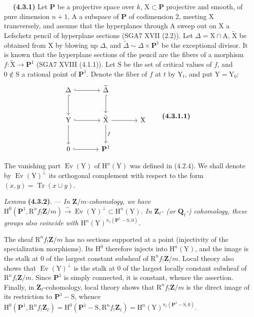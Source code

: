 \documentclass[11pt,leqno]{article}
\newcommand{\Page}[1]{\ifvmode\noindent\else\unskip\ \fi{\footnotesize\textcolor{gray}{[p.\,#1]}}\ \ignorespaces}
\begin{document}
\Page{222}
\textbf{(4.3.1)} Let \(\mathbf{P}\) be a projective space over \(k\), \(\mathrm{X}\subset\mathbf{P}\) projective and smooth, of pure dimension \(n+1\), \(\mathrm{A}\) a subspace of \(\mathbf{P}\) of codimension 2, meeting \(\mathrm{X}\) transversely, and assume that the hyperplanes through \(\mathrm{A}\) sweep out on \(\mathrm{X}\) a Lefschetz pencil of hyperplane sections (SGA7 XVII (2.2)). Let \(\Delta=\mathrm{X}\cap\mathrm{A}\), \(\widetilde{\mathrm{X}}\) be obtained from \(\mathrm{X}\) by blowing up \(\Delta\), and \(\widetilde{\Delta}\sim\Delta\times\mathbf{P}^1\) be the exceptional divisor. It is known that the hyperplane sections of the pencil are the fibers of a morphism \(f:\widetilde{\mathrm{X}}\to\mathbf{P}^1\) (SGA7 XVIII (4.1.1)). Let \(\mathrm{S}\) be the set of critical values of \(f\), and \(0\notin\mathrm{S}\) a rational point of \(\mathbf{P}^1\). Denote the fiber of \(f\) at \(t\) by \(\mathrm{Y}_t\), and put \(\mathrm{Y}=\mathrm{Y}_0\):
\[
\begin{tikzcd}[column sep=large,row sep=large]
\Delta \arrow[r,hook] \arrow[d,hook]
  & \widetilde{\Delta} \arrow[d,hook] & {} \\
\mathrm{Y} \arrow[r,hook] \arrow[d]
  & \widetilde{\mathrm{X}} \arrow[r] \arrow[d,"f"]
  & \mathrm{X} \\
0 \arrow[r,hook] & \mathbf{P}^1 & {}
\end{tikzcd}
\tag*{\textbf{(4.3.1.1)}}
\]

The vanishing part \(\operatorname{Ev}(\mathrm{Y})\) of \(\mathrm{H}^n(\mathrm{Y})\) was defined in (4.2.4). We shall denote by \(\operatorname{Ev}(\mathrm{Y})^\perp\) its orthogonal complement with respect to the form \((x,y)=\operatorname{Tr}(x\cup y)\).

\textit{Lemma} \textbf{(4.3.2)}. — \textit{In \(\mathbf{Z}/m\)-cohomology, we have \(\mathrm{H}^0(\mathbf{P}^1,\mathrm{R}^n f_!\mathbf{Z}/m)\xrightarrow{\sim}\operatorname{Ev}(\mathrm{Y})^\perp\subset\mathrm{H}^n(\mathrm{Y})\). In \(\mathbf{Z}_\ell\)- (or \(\mathbf{Q}_\ell\)-) cohomology, these groups also coincide with \(\mathrm{H}^n(\mathrm{Y})^{\pi_1(\mathbf{P}^1-\mathrm{S},0)}\).}

The sheaf \(\mathrm{R}^n f_!\mathbf{Z}/m\) has no sections supported at a point (injectivity of the specialization morphisms). Its \(\mathrm{H}^0\) therefore injects into \(\mathrm{H}^n(\mathrm{Y})\), and the image is the stalk at \(0\) of the largest constant subsheaf of \(\mathrm{R}^n f_!\mathbf{Z}/m\). Local theory also shows that \(\operatorname{Ev}(\mathrm{Y})^\perp\) is the stalk at \(0\) of the largest locally constant subsheaf of \(\mathrm{R}^n f_!\mathbf{Z}/m\). Since \(\mathbf{P}^1\) is simply connected, it is constant, whence the assertion. Finally, in \(\mathbf{Z}_\ell\)-cohomology, local theory shows that \(\mathrm{R}^n f_!\mathbf{Z}/m\) is the direct image of its restriction to \(\mathbf{P}^1-\mathrm{S}\), whence \(\mathrm{H}^0(\mathbf{P}^1,\mathrm{R}^n f_!\mathbf{Z}_\ell)=\mathrm{H}^0(\mathbf{P}^1-\mathrm{S},\mathrm{R}^n f_!\mathbf{Z}_\ell)=\mathrm{H}^n(\mathrm{Y})^{\pi_1(\mathbf{P}^1-\mathrm{S},0)}\).
\end{document}
